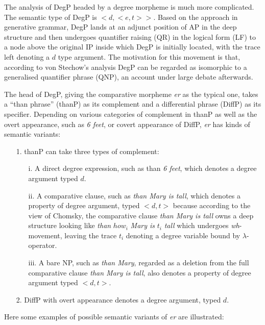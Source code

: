 \documentclass{ctexart}
\let \cite \parencite
\begin{document}
The analysis of DegP headed by a degree morpheme is much more complicated. The semantic type of DegP is $<d,<e,t>>$. Based on the approach in generative grammar, DegP lands at an adjunct position of AP in the deep structure and then undergoes quantifier raising (QR) in the logical form (LF) to a node above the original IP inside which DegP is initially located, with the trace left denoting a $d$ type argument. The motivation for this movement is that, according to von Stechow’s analysis DegP can be regarded as isomorphic to a generalised quantifier phrase (QNP), an account under large debate afterwards.

The head of DegP, giving the comparative morpheme \textit{er} as the typical one, takes a “than phrase” (thanP) as its complement and a differential phrase (DiffP) as its specifier. Depending on various categories of complement in thanP as well as the overt appearance, such as \textit{6 feet}, or covert appearance of DiffP, \textit{er} has kinds of semantic variants:

\begin{itemize}
    \item[1.] thanP can take three types of complement:

    \begin{itemize}
        \item[i.] A direct degree expression, such as than \textit{6 feet}, which denotes a degree argument typed $d$.
        \item[ii.] A comparative clause, such as \textit{than Mary is tall}, which denotes a property of degree argument, typed $<d,t>$ because according to the view of Chomsky, the comparative clause \textit{than Mary is tall} owns a deep structure looking like \textit{than} $how_i$ \textit{Mary is} $t_i$ \textit{tall} which undergoes \textit{wh}-movement, leaving the trace $t_i$ denoting a degree variable bound by $\lambda$-operator\cite{chomsky1977}.
        \item[iii.] A bare NP, such as \textit{than Mary}, regarded as a deletion from the full comparative clause \textit{than Mary is tall}, also denotes a property of degree argument typed $<d,t>$.
    \end{itemize}

    \item[2.] DiffP with overt appearance denotes a degree argument, typed $d$.

\end{itemize}

Here some examples of possible semantic variants of \textit{er} are illustrated:
\end{document}
